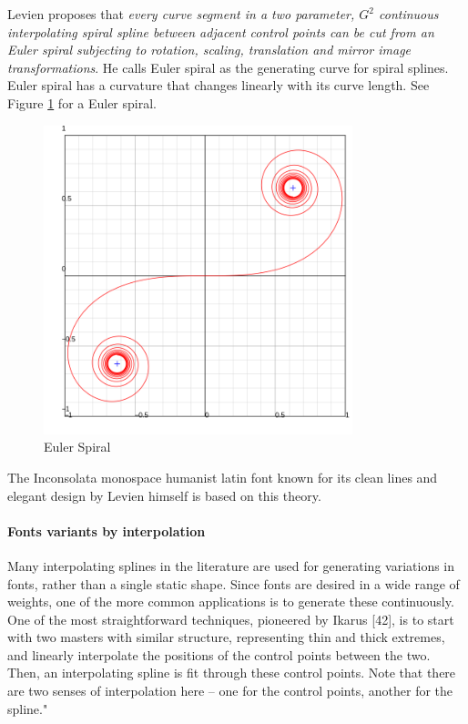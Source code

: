 \documentclass[11pt,twoside,a4paper]{article}
\begin{document}
Levien proposes that \textit{every curve segment in a two parameter,  $G^2$ continuous interpolating spiral spline between adjacent control points can be cut from an Euler spiral subjecting to rotation, scaling, translation and mirror image transformations}. He calls Euler spiral as the generating curve for spiral splines. Euler spiral has a curvature that changes linearly with its curve length. See Figure \ref{eulerspiral} for a Euler spiral.


\begin{figure}
	\includegraphics[width=0.8\textwidth]{images/Euler_spiral.png}
	\caption{Euler Spiral}
	\label{eulerspiral}
\end{figure}


The Inconsolata monospace humanist latin font known for its clean lines and elegant design by Levien himself is based on this theory.

\paragraph{Fonts variants by interpolation}
Many interpolating splines in the literature are used for generating variations in fonts, rather
than a single static shape. Since fonts are desired in a wide range of weights, one of the more
common applications is to generate these continuously. One of the most straightforward techniques,
pioneered by Ikarus [42], is to start with two masters with similar structure, representing thin
and thick extremes, and linearly interpolate the positions of the control points between the two.
Then, an interpolating spline is fit through these control points. Note that there are two senses of
interpolation here – one for the control points, another for the spline." \cite{lamport94}
\end{document}
